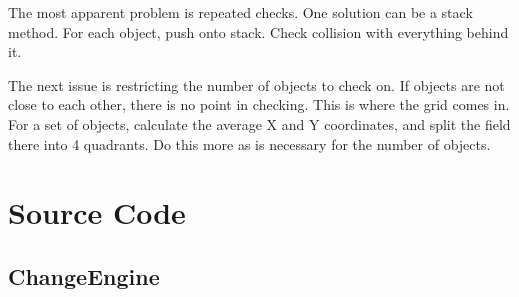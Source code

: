 \documentclass[12pt]{article}
\begin{document}
      The most apparent problem is repeated checks. One solution can be a stack method. For each object, push onto stack. Check collision with everything behind it.

      The next issue is restricting the number of objects to check on. If objects are not close to each other, there is no point in checking. This is where the grid comes in. For a set of objects, calculate the average X and Y coordinates, and split the field there into 4 quadrants. Do this more as is necessary for the number of objects.

  \section{Source Code}
\subsection{ChangeEngine}
\end{document}
